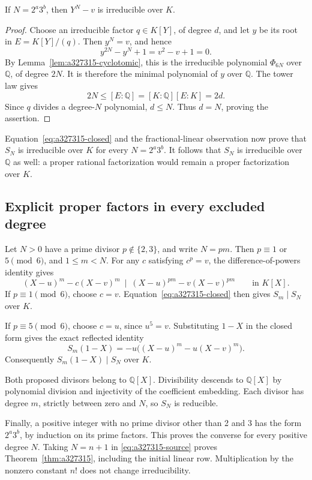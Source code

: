 \begin{lemma}
\label{lem:a327315-binomial}
If $N=2^a3^b$, then $Y^N-v$ is irreducible over $K$.
\end{lemma}
\begin{proof}
Choose an irreducible factor $q\in K[Y]$, of degree $d$, and let $y$ be
its root in $E=K[Y]/(q)$.  Then $y^N=v$, and hence
\[
 y^{2N}-y^N+1=v^2-v+1=0.
\]
By Lemma~\ref{lem:a327315-cyclotomic}, this is the irreducible polynomial
$\Phi_{6N}$ over $\mathbb Q$, of degree $2N$.  It is therefore the
minimal polynomial of $y$ over $\mathbb Q$.  The tower law gives
\[
 2N\le[E:\mathbb Q]=[K:\mathbb Q][E:K]=2d.
\]
Since $q$ divides a degree-$N$ polynomial, $d\le N$.  Thus $d=N$, proving
the assertion.
\end{proof}

Equation~\eqref{eq:a327315-closed} and the fractional-linear observation
now prove that $S_N$ is irreducible over $K$ for every $N=2^a3^b$.
It follows that $S_N$ is irreducible over $\mathbb Q$ as well: a proper
rational factorization would remain a proper factorization over $K$.

\subsection{Explicit proper factors in every excluded degree}

Let $N>0$ have a prime divisor $p\notin\{2,3\}$, and write $N=pm$.
Then $p\equiv1$ or $5\pmod6$, and $1\le m<N$.
For any $c$ satisfying $c^p=v$, the difference-of-powers identity gives
\[
 (X-u)^m-c(X-v)^m
 \ \mid\ (X-u)^{pm}-v(X-v)^{pm}
 \qquad\text{in }K[X].
\]
If $p\equiv1\pmod6$, choose $c=v$.  Equation~\eqref{eq:a327315-closed}
then gives $S_m\mid S_N$ over $K$.

If $p\equiv5\pmod6$, choose $c=u$, since $u^5=v$.  Substituting $1-X$
in the closed form gives the exact reflected identity
\[
 S_m(1-X)=-u\big((X-u)^m-u(X-v)^m\big).
\]
Consequently $S_m(1-X)\mid S_N$ over $K$.

Both proposed divisors belong to $\mathbb Q[X]$.  Divisibility descends
to $\mathbb Q[X]$ by polynomial division and injectivity of the
coefficient embedding.  Each divisor has degree $m$, strictly between
zero and $N$, so $S_N$ is reducible.

Finally, a positive integer with no prime divisor other than 2 and 3
has the form $2^a3^b$, by induction on its prime factors.  This proves
the converse for every positive degree $N$.  Taking $N=n+1$ in
\eqref{eq:a327315-source} proves Theorem~\ref{thm:a327315}, including
the initial linear row.  Multiplication by the nonzero constant $n!$
does not change irreducibility.


